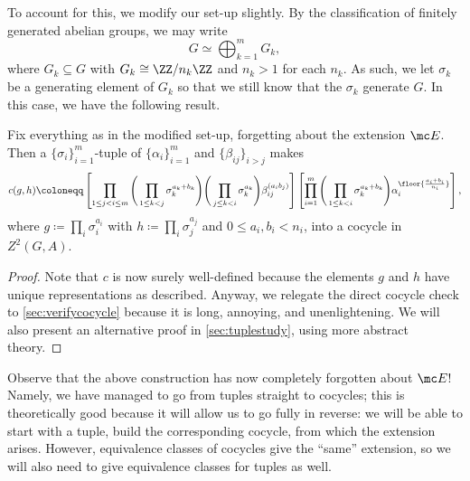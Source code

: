 \documentclass{article}
\numberwithin{equation}{section}
\begin{document}
To account for this, we modify our set-up slightly. By the classification of finitely generated abelian groups, we may write
\[ G\simeq\bigoplus_{k=1}^m G_k,\]
where $ G_k\subseteq G$ with $ G_k\cong\ZZ/n_k\ZZ$ and $n_k>1$ for each $n_k$. As such, we let $\sigma_k$ be a generating element of $ G_k$ so that we still know that the $\sigma_k$ generate $ G$. In this case, we have the following result.
\begin{theorem} \label{thm:getcocycle}
	Fix everything as in the modified set-up, forgetting about the extension $\mc E$. Then a $\{\sigma_i\}_{i=1}^m$-tuple of $\{\alpha_i\}_{i=1}^m$ and $\{\beta_{ij}\}_{i>j}$ makes
	\[c(g,h)\coloneqq\left[\prod_{1\le j<i\le m}\Bigg(\prod_{1\le k<j}\sigma_k^{a_k+b_k}\Bigg)\Bigg(\prod_{j\le k<i}\sigma_k^{a_k}\Bigg)\beta_{ij}^{(a_ib_j)}\right]\left[\prod_{i=1}^m\Bigg(\prod_{1\le k<i}\sigma_k^{a_k+b_k}\Bigg)\alpha_i^{\floor{\frac{a_i+b_i}{n_i}}}\right],\]
	where $g\coloneqq\prod_i\sigma_i^{a_i}$ with $h\coloneqq\prod_i\sigma_j^{a_j}$ and $0\le a_i,b_i<n_i$, into a cocycle in $Z^2( G,A)$.
\end{theorem}
\begin{proof}
	Note that $c$ is now surely well-defined because the elements $g$ and $h$ have unique representations as described. Anyway, we relegate the direct cocycle check to \autoref{sec:verifycocycle} because it is long, annoying, and unenlightening. We will also present an alternative proof in \autoref{sec:tuplestudy}, using more abstract theory.
\end{proof}
Observe that the above construction has now completely forgotten about $\mc E$! Namely, we have managed to go from tuples straight to cocycles; this is theoretically good because it will allow us to go fully in reverse: we will be able to start with a tuple, build the corresponding cocycle, from which the extension arises. However, equivalence classes of cocycles give the ``same'' extension, so we will also need to give equivalence classes for tuples as well.
\end{document}
